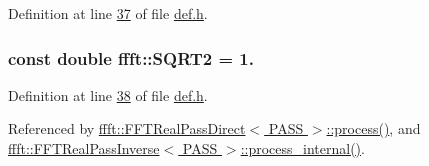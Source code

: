 Definition at line \hyperlink{a00089_source_l00037}{37} of file \hyperlink{a00089_source}{def.\+h}.

\hypertarget{a00142_a489004390ad7d791bf53a724c0f07abb}{
\subsubsection[{S\+Q\+R\+T2}]{\setlength{\rightskip}{0pt plus 5cm}const double ffft\+::\+S\+Q\+R\+T2 = 1.}}\label{a00142_a489004390ad7d791bf53a724c0f07abb}


Definition at line \hyperlink{a00089_source_l00038}{38} of file \hyperlink{a00089_source}{def.\+h}.



Referenced by \hyperlink{a00101_source_l00074}{ffft\+::\+F\+F\+T\+Real\+Pass\+Direct$<$ P\+A\+S\+S $>$\+::process()}, and \hyperlink{a00103_source_l00157}{ffft\+::\+F\+F\+T\+Real\+Pass\+Inverse$<$ P\+A\+S\+S $>$\+::process\+\_\+internal()}.

